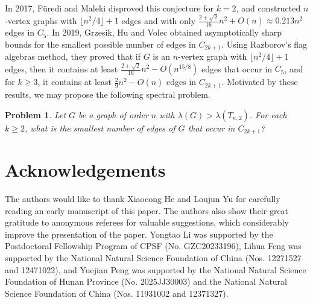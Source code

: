 \documentclass[11pt]{article}
\newtheorem{problem}[theorem]{Problem}
\begin{document}
In 2017, F\"{u}redi and Maleki \cite{FM2017}  
disproved this conjecture for $k=2$, and  
constructed $n$-vertex graphs with $\lfloor n^2/4 \rfloor +1$ 
edges and with only $ \frac{2+\sqrt{2}}{16} n^2 + O(n) \approx 
0.213 n^2$ edges in $C_5$. 
In 2019, Grzesik, Hu and Volec 
\cite{GHV2019} obtained 
asymptotically sharp bounds for the smallest possible
number of edges in $C_{2k+1}$. Using Razborov's  flag algebras method, they proved that if 
$G$ is an $n$-vertex graph with $\lfloor n^2/4 \rfloor +1$ edges, 
then it contains at least $\frac{2+\sqrt{2}}{16} n^2 - O(n^{15/8})$ 
edges that occur in $C_5$, 
and for $k\ge 3$, it contains at least $\frac{2}{9}n^2 - O(n)$ 
edges in $C_{2k+1}$. 
Motivated by these results, 
we may propose the following spectral problem. 

\begin{problem}
Let $G$ be a graph of order $n$ with $\lambda (G) > \lambda (T_{n,2})$. 
For each $k\ge 2$, what is the smallest number of edges of $G$ that 
occur in $C_{2k+1}$?  
\end{problem} 

 
 

\section*{Acknowledgements}  
The authors would like to thank Xiaocong He and Loujun Yu 
for carefully reading an early manuscript of this paper. 
 The authors also show their great gratitude to anonymous referees for valuable suggestions, which considerably improve the presentation of the paper. 
Yongtao Li was supported by the Postdoctoral Fellowship Program of CPSF (No. GZC20233196), 
 Lihua Feng was supported by the National Natural Science Foundation of China (Nos. 12271527 and 12471022), and Yuejian Peng was supported by 
 the National Natural Science Foundation of Hunan Province (No. 2025JJ30003) and 
the National Natural Science Foundation of China (Nos. 11931002 and 12371327).  
\end{document}

